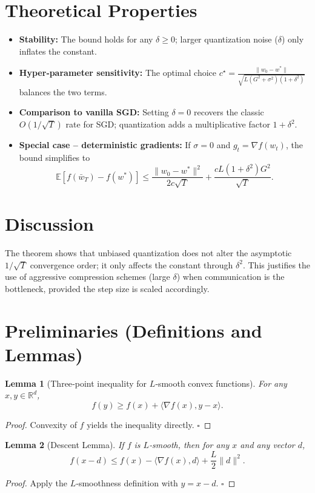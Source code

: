 \documentclass{article}
\newtheorem{lemma}{Lemma}
\newcommand{\E}{\mathbb{E}}
\newcommand{\R}{\mathbb{R}}
\begin{document}
\section*{Theoretical Properties}
\begin{itemize}
\item \textbf{Stability:} The bound holds for any $\delta\ge0$; larger quantization noise ($\delta$) only inflates the constant.
\item \textbf{Hyper‑parameter sensitivity:} The optimal choice $c^{\star}= \frac{\|w_{0}-w^{*}\|}{\sqrt{L(G^{2}+\sigma^{2})(1+\delta^{2})}}$ balances the two terms.
\item \textbf{Comparison to vanilla SGD:} Setting $\delta=0$ recovers the classic $O(1/\sqrt{T})$ rate for SGD; quantization adds a multiplicative factor $1+\delta^{2}$.
\item \textbf{Special case – deterministic gradients:} If $\sigma=0$ and $g_{t}=\nabla f(w_{t})$, the bound simplifies to
\[
\E[f(\bar w_{T})-f(w^{*})]\le
\frac{\|w_{0}-w^{*}\|^{2}}{2c\sqrt{T}}+\frac{cL(1+\delta^{2})G^{2}}{\sqrt{T}}.
\]
\end{itemize}

\section*{Discussion}
The theorem shows that unbiased quantization does not alter the asymptotic $1/\sqrt{T}$ convergence order; it only affects the constant through $\delta^{2}$. This justifies the use of aggressive compression schemes (large $\delta$) when communication is the bottleneck, provided the step size is scaled accordingly.

\newpage
\section*{Preliminaries (Definitions and Lemmas)}
\begin{lemma}[Three‑point inequality for $L$‑smooth convex functions]\label{lem:threepoint}
For any $x,y\in\R^{d}$,
\[
f(y)\ge f(x)+\langle\nabla f(x),y-x\rangle.
\]
\end{lemma}
\begin{proof}
Convexity of $f$ yields the inequality directly. \hfill\(\square\)
\end{proof}
\begin{lemma}[Descent Lemma]\label{lem:descent}
If $f$ is $L$‑smooth, then for any $x$ and any vector $d$,
\[
f(x-d)\le f(x)-\langle\nabla f(x),d\rangle+\frac{L}{2}\|d\|^{2}.
\]
\end{lemma}
\begin{proof}
Apply the $L$‑smoothness definition with $y=x-d$. \hfill\(\square\)
\end{proof}
\end{document}
